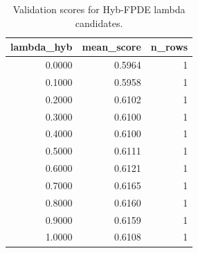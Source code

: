 \begin{table}[t]
\caption{Validation scores for Hyb-FPDE lambda candidates.}
\label{tab:lambda_distribution_computed}
\centering
\begin{tabular}{rrr}
\toprule
lambda\_hyb & mean\_score & n\_rows \\
\midrule
0.0000 & 0.5964 & 1 \\
0.1000 & 0.5958 & 1 \\
0.2000 & 0.6102 & 1 \\
0.3000 & 0.6100 & 1 \\
0.4000 & 0.6100 & 1 \\
0.5000 & 0.6111 & 1 \\
0.6000 & 0.6121 & 1 \\
0.7000 & 0.6165 & 1 \\
0.8000 & 0.6160 & 1 \\
0.9000 & 0.6159 & 1 \\
1.0000 & 0.6108 & 1 \\
\bottomrule
\end{tabular}

\end{table}
